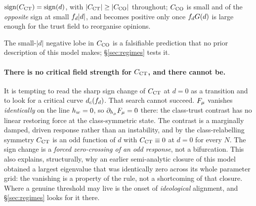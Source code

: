 \begin{corollary}
\label{cor:ordering}
$\mathrm{sign}(C_{\mathrm{CT}})=\mathrm{sign}(d)$, with $|C_{\mathrm{CT}}|\ge|C_{\mathrm{CO}}|$ throughout;
$C_{\mathrm{CO}}$ is small and of the \emph{opposite} sign at small $f_{d}|d|$, and becomes
positive only once $f_{d}G(d)$ is large enough for the trust field to
reorganise opinions.
\end{corollary}

The small-$|d|$ negative lobe in $C_{\mathrm{CO}}$ is a falsifiable prediction that no
prior description of this model makes; \S\ref{sec:regimes} tests it.

\paragraph{There is no critical field strength for $C_{\mathrm{CT}}$, and there cannot be.}
It is tempting to read the sharp sign change of $C_{\mathrm{CT}}$ at $d=0$ as a transition
and to look for a critical curve $d_c(f_{d})$. That search cannot succeed.
$F_{\mu}$ vanishes \emph{identically} on the line $h_{w}=0$, so
$\partial_{h_{\mu}}F_{\mu}=0$ there: the class-trust contrast has no linear restoring
force at the class-symmetric state. The contrast is a marginally damped, driven
response rather than an instability, and by the class-relabelling symmetry
$C_{\mathrm{CT}}$ is an odd function of $d$ with $C_{\mathrm{CT}}\equiv0$ at $d=0$ for every $N$. The
sign change is a \emph{forced zero-crossing of an odd response}, not a
bifurcation. This also explains, structurally, why an earlier semi-analytic
closure of this model obtained a largest eigenvalue that was identically zero
across its whole parameter grid: the vanishing is a property of the rule, not a
shortcoming of that closure. Where a genuine threshold may live is the onset of
\emph{ideological} alignment, and \S\ref{sec:regimes} looks for it there.
